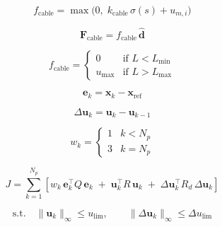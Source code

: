 \begin{equation}
\label{eq:cable_mag}
f_{\mathrm{cable}} = \max\!\bigl(0,\;
k_{\mathrm{cable}}\,\sigma(s) + u_{m,i}\bigr)
\end{equation}

\begin{equation}
\label{eq:cable_force}
\mathbf{F}_{\mathrm{cable}} = f_{\mathrm{cable}}\,\hat{\mathbf{d}}
\end{equation}

\begin{equation}
\label{eq:cable_sat}
f_{\mathrm{cable}} =
\begin{cases}
0       & \text{if } L < L_{\min} \\[4pt]
u_{\max} & \text{if } L > L_{\max}
\end{cases}
\end{equation}



\begin{equation}
\label{eq:track_err}
\mathbf{e}_k = \mathbf{x}_k - \mathbf{x}_{\mathrm{ref}}
\end{equation}

\begin{equation}
\label{eq:ctrl_inc}
\Delta\mathbf{u}_k = \mathbf{u}_k - \mathbf{u}_{k-1}
\end{equation}

\begin{equation}
\label{eq:term_weight}
w_k =
\begin{cases}
1 & k < N_p \\
3 & k = N_p
\end{cases}
\end{equation}

\begin{equation}
\label{eq:nmpc_cost}
J = \sum_{k=1}^{N_p} \left[
  w_k\,\mathbf{e}_k^\top Q\,\mathbf{e}_k
  \;+\; \mathbf{u}_k^\top R\,\mathbf{u}_k
  \;+\; \Delta\mathbf{u}_k^\top R_d\,\Delta\mathbf{u}_k
\right]
\end{equation}

\begin{equation}
\label{eq:nmpc_constraints}
\text{s.t.} \quad
\|\mathbf{u}_k\|_\infty \leq u_{\mathrm{lim}}, \qquad
\|\Delta\mathbf{u}_k\|_\infty \leq \Delta u_{\mathrm{lim}}
\end{equation}

